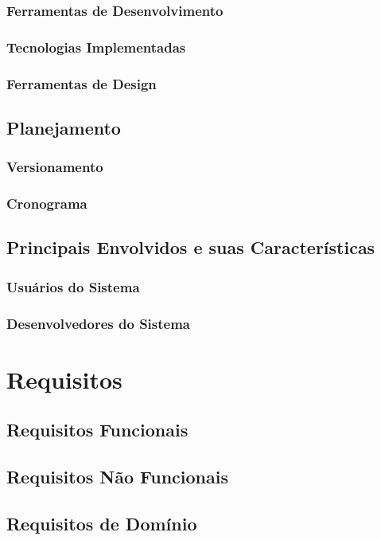 \documentclass[a4paper,12pt]{article}
\begin{document}
\subsubsection{Ferramentas de Desenvolvimento}
\subsubsection{Tecnologias Implementadas}
\subsubsection{Ferramentas de Design}
\subsection{Planejamento}
\subsubsection{Versionamento}
\subsubsection{Cronograma}
\subsection{Principais Envolvidos e suas Características}
\subsubsection{Usuários do Sistema}
\subsubsection{Desenvolvedores do Sistema}
\pagebreak
\section{Requisitos}
\subsection{Requisitos Funcionais}
\subsection{Requisitos Não Funcionais}
\subsection{Requisitos de Domínio}
\pagebreak
\end{document}
